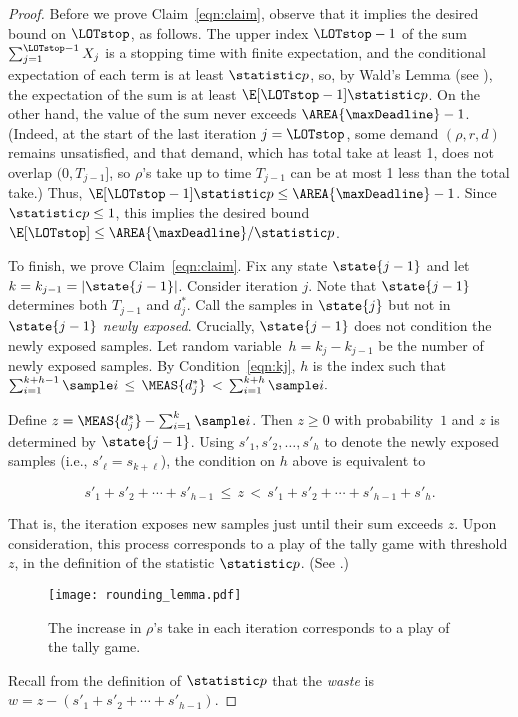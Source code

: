 \begin{proof}
  Before we prove Claim~\eqref{eqn:claim},
  observe that it implies the desired bound on $\LOTstop$, as follows.
  The upper index $\LOTstop-1$ of the sum $\sum_{j=1}^{\LOTstop-1} X_j$
  is a stopping time with finite expectation,
  and the conditional expectation of each term is at least $\statistic p$,
  so, by Wald's Lemma (see ),
  the expectation of the sum is at least $\E[\LOTstop-1] \statistic p$.
  On the other hand,  the value of the sum never exceeds $\AREA{\maxDeadline}-1$.
  (Indeed,   at the start of the last iteration $j=\LOTstop$, 
  some demand $(\rho, r, d)$ remains unsatisfied,
  and that demand, which has total take at least 1,
  does not overlap $(0,T_{j-1}]$,
  so $\rho$'s take up to time $T_{j-1}$ can be at most 1 less than the total take.)
  Thus, $\E[\LOTstop -1]\statistic p \le \AREA{\maxDeadline}-1$.
  Since $\statistic p \le 1$, this implies the desired bound $\E[\LOTstop] \le \AREA{\maxDeadline}/\statistic p$.

  To finish, we prove Claim~\eqref{eqn:claim}.
  Fix any state $\state {j-1}$ and  let $k=k_{j-1}=|\state {j-1}|$.
  Consider iteration $j$.
  Note that $\state {j-1}$ determines both $T_{j-1}$ and $d^*_j$.
  Call the samples in $\state{j}$ but not in $\state {j-1}$ {\em newly exposed}.
  Crucially, $\state {j-1}$ does not condition the newly exposed samples.
  Let random variable~$h = k_j-k_{j-1}$ be the number of newly exposed samples.
  By Condition~\eqref{eqn:kj}, $h$ is the index such that
  \(
  \sum_{i=1}^{k+h-1} \sample i
  \,\le\, \MEAS{d^*_j}
  \,<\, 
  \sum_{i=1}^{k+h} \sample i.
  \)

  Define $z = \MEAS{d^*_j} - \sum_{i=1}^{k} \sample i$. Then $z\ge 0$ with probability~$1$ and $z$
  is determined by $\state {j-1}$.
  Using $s'_1, s'_2, \ldots, s'_h$ to denote the newly exposed samples (i.e., $s'_\ell = s_{k+\ell}$),
  the condition on $h$ above is equivalent to

  \[
  s'_1 + s'_2 + \cdots + s'_{h-1} \,\le\, z \,<\,   s'_1 + s'_2 + \cdots + s'_{h-1} + s'_h.
  \]

\noindent
  That is, the iteration exposes new samples just until their sum exceeds $z$.
  Upon consideration, this process corresponds to a play of the tally game with threshold $z$,
  in the definition of the statistic $\statistic p$.
  (See .)
\begin{figure}[t]
    \centering
    \texttt{[image: rounding\_lemma.pdf]}
\caption{The increase in $\rho$'s take in each iteration corresponds to a play of the tally game.}
    \label{fig:tally}
  \end{figure}
Recall from the definition of $\statistic p$
  that the {\em waste} is $w = z-(s'_1+s'_2+\cdots+s'_{h-1})$.


\end{proof}
